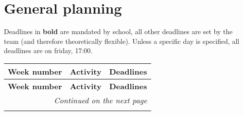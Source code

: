 \documentclass{article} %
\begin{document}
\section{General planning} %
Deadlines in \textbf{bold} are mandated by school, all other deadlines are set by the team (and therefore theoretically flexible).
Unless a specific day is specified, all deadlines are on friday, 17:00.
\begin{longtable}{|l|p{}|p{}|}
    \hline
    \textbf{Week number} & \textbf{Activity}                         & \textbf{Deadlines}                      \\ \hline
    \endfirsthead

    \hline
    \textbf{Week number} & \textbf{Activity}                         & \textbf{Deadlines}                      \\ \hline
    \endhead

    \hline \multicolumn{3}{r}{\textit{Continued on the next page}}                                             \\ \hline
    \endfoot

    \hline
    \endlastfoot


\end{longtable}
\end{document}
